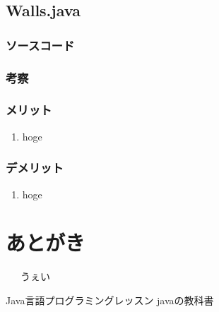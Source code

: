 \documentclass[12pt]{jarticle} %
\begin{document}
\begin{flushleft}
\subsection{Walls.java}
\subsubsection{ソースコード}

\subsubsection{考察}
\subsubsection{メリット}
\begin{enumerate}
\item hoge
\end{enumerate}
\subsubsection{デメリット}
\begin{enumerate}
\item hoge
\end{enumerate}

\section{あとがき}
\ \ \ うぇい
\end{flushleft}


\begin{thebibliography}{9} 
	\bibitem{}Java言語プログラミングレッスン
	\bibitem{}javaの教科書
\end{thebibliography}
\end{document}

